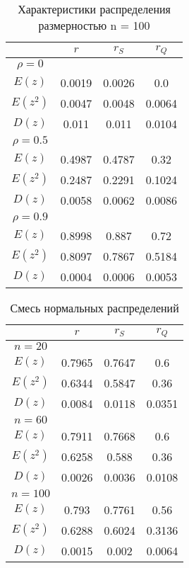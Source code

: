 \documentclass[../main.tex]{subfiles}
\begin{document}
    \begin{table}[H]
        \centering
        \begin{tabular}{|c|c|c|c|}
            \hline
            & $r$ & $r_S$ & $r_Q$\\\hline
            $\rho=0$ & & &\\\hline
            $E(z)$ & 0.0019 & 0.0026 & 0.0\\\hline
            $E(z^2)$ & 0.0047 & 0.0048 & 0.0064\\\hline
            $D(z)$ & 0.011 & 0.011 & 0.0104\\\hline
            \hline
            $\rho=0.5$ & & &\\\hline
            $E(z)$ & 0.4987 & 0.4787 & 0.32\\\hline
            $E(z^2)$ & 0.2487 & 0.2291 & 0.1024\\\hline
            $D(z)$ & 0.0058 & 0.0062 & 0.0086\\\hline
            \hline
            $\rho=0.9$ & & &\\\hline
            $E(z)$ & 0.8998 & 0.887 & 0.72\\\hline
            $E(z^2)$ & 0.8097 & 0.7867 & 0.5184\\\hline
            $D(z)$ & 0.0004 & 0.0006 & 0.0053\\\hline
        \end{tabular}
        \caption{Характеристики распределения размерностью n = 100}
    \end{table}
    
    \begin{table}[H]
        \centering
        \begin{tabular}{|c|c|c|c|}
            \hline
            & $r$ & $r_S$ & $r_Q$\\\hline
            $n=20$ & & &\\\hline
            $E(z)$ & 0.7965 & 0.7647 & 0.6\\\hline
            $E(z^2)$ & 0.6344 & 0.5847 & 0.36\\\hline
            $D(z)$ & 0.0084 & 0.0118 & 0.0351\\\hline
            \hline
            $n=60$ & & &\\\hline
            $E(z)$ & 0.7911 & 0.7668 & 0.6\\\hline
            $E(z^2)$ & 0.6258 & 0.588 & 0.36\\\hline
            $D(z)$ & 0.0026 & 0.0036 & 0.0108\\\hline
            \hline
            $n=100$ & & &\\\hline
            $E(z)$ & 0.793 & 0.7761 & 0.56\\\hline
            $E(z^2)$ & 0.6288 & 0.6024 & 0.3136\\\hline
            $D(z)$ & 0.0015 & 0.002 & 0.0064\\\hline
        \end{tabular}
        \caption{Смесь нормальных распределений}
    \end{table}
    
\end{document}
